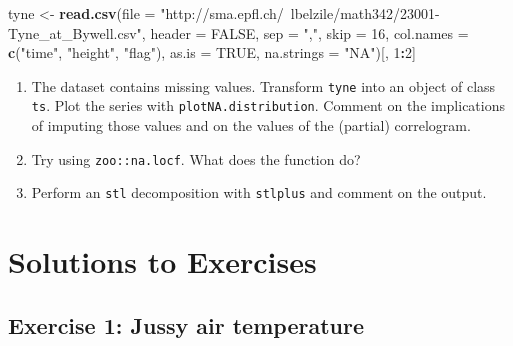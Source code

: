 \documentclass[]{book}
\newenvironment{Shaded}{\begin{snugshade}}{\end{snugshade}}
\newcommand{\DataTypeTok}[1]{\textcolor[rgb]{0.13,0.29,0.53}{#1}}
\newcommand{\DecValTok}[1]{\textcolor[rgb]{0.00,0.00,0.81}{#1}}
\newcommand{\KeywordTok}[1]{\textcolor[rgb]{0.13,0.29,0.53}{\textbf{#1}}}
\newcommand{\NormalTok}[1]{#1}
\newcommand{\OperatorTok}[1]{\textcolor[rgb]{0.81,0.36,0.00}{\textbf{#1}}}
\newcommand{\OtherTok}[1]{\textcolor[rgb]{0.56,0.35,0.01}{#1}}
\newcommand{\StringTok}[1]{\textcolor[rgb]{0.31,0.60,0.02}{#1}}
\providecommand{\tightlist}{%
  \setlength{\itemsep}{0pt}\setlength{\parskip}{0pt}}
\begin{document}
\begin{Shaded}
\begin{Highlighting}[]
\NormalTok{tyne <-}\StringTok{ }\KeywordTok{read.csv}\NormalTok{(}\DataTypeTok{file =} \StringTok{"http://sma.epfl.ch/~lbelzile/math342/23001-Tyne_at_Bywell.csv"}\NormalTok{, }
    \DataTypeTok{header =} \OtherTok{FALSE}\NormalTok{, }\DataTypeTok{sep =} \StringTok{","}\NormalTok{, }\DataTypeTok{skip =} \DecValTok{16}\NormalTok{, }\DataTypeTok{col.names =} \KeywordTok{c}\NormalTok{(}\StringTok{"time"}\NormalTok{, }\StringTok{"height"}\NormalTok{, }\StringTok{"flag"}\NormalTok{), }
    \DataTypeTok{as.is =} \OtherTok{TRUE}\NormalTok{, }\DataTypeTok{na.strings =} \StringTok{"NA"}\NormalTok{)[, }\DecValTok{1}\OperatorTok{:}\DecValTok{2}\NormalTok{]}
\end{Highlighting}
\end{Shaded}

\begin{enumerate}
\def\labelenumi{\arabic{enumi}.}
\setcounter{enumi}{1}
\tightlist
\item
  The dataset contains missing values. Transform \texttt{tyne} into an
  object of class \texttt{ts}. Plot the series with
  \texttt{plotNA.distribution}. Comment on the implications of imputing
  those values and on the values of the (partial) correlogram.
\item
  Try using \texttt{zoo::na.locf}. What does the function do?
\item
  Perform an \texttt{stl} decomposition with \texttt{stlplus} and
  comment on the output.
\end{enumerate}

\hypertarget{solutions-to-exercises-3}{%
\section{Solutions to Exercises}\label{solutions-to-exercises-3}}

\hypertarget{exercise-1-jussy-air-temperature-1}{%
\subsection{Exercise 1: Jussy air
temperature}\label{exercise-1-jussy-air-temperature-1}}
\end{document}
